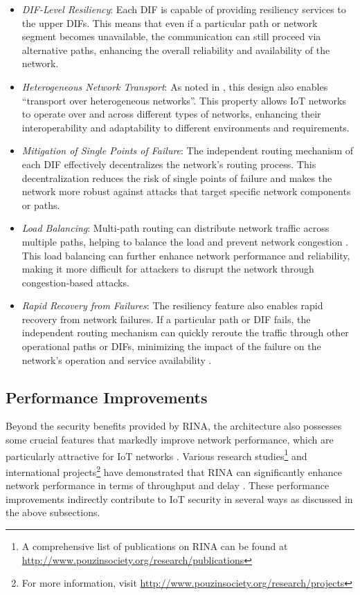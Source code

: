 \documentclass{ieeeaccess}
\begin{document}
\begin{itemize}
	\item \textit{DIF-Level Resiliency}: Each DIF is capable of providing resiliency services to the upper DIFs. This means that even if a particular path or network segment becomes unavailable, the communication can still proceed via alternative paths, enhancing the overall reliability and availability of the network.
	\item \textit{Heterogeneous Network Transport}: As noted in \cite{Trouva:2011:TOH}, this design also enables ``transport over heterogeneous networks''. This property allows IoT networks to operate over and across different types of networks, enhancing their interoperability and adaptability to different environments and requirements.
	\item \textit{Mitigation of Single Points of Failure}: The independent routing mechanism of each DIF effectively decentralizes the network's routing process. This decentralization reduces the risk of single points of failure and makes the network more robust against attacks that target specific network components or paths.
	\item \textit{Load Balancing}: Multi-path routing can distribute network traffic across multiple paths, helping to balance the load and prevent network congestion \cite{marek2019high}. This load balancing can further enhance network performance and reliability, making it more difficult for attackers to disrupt the network through congestion-based attacks.
	\item \textit{Rapid Recovery from Failures}: The resiliency feature also enables rapid recovery from network failures. If a particular path or DIF fails, the independent routing mechanism can quickly reroute the traffic through other operational paths or DIFs, minimizing the impact of the failure on the network's operation and service availability \cite{neelam2021applicability}.
\end{itemize}

\subsection{Performance Improvements}

Beyond the security benefits provided by RINA, the architecture also possesses some crucial features that markedly improve network performance, which are particularly attractive for IoT networks \cite{trouva2010internet}. Various research studies\footnote{A comprehensive list of publications on RINA can be found at \underline{http://www.pouzinsociety.org/research/publications}} and international projects\footnote{For more information, visit \underline{http://www.pouzinsociety.org/research/projects}} have demonstrated that RINA can significantly enhance network performance in terms of throughput and delay \cite{peymanICC16}. These performance improvements indirectly contribute to IoT security in several ways as discussed in the above subsections.
\end{document}
